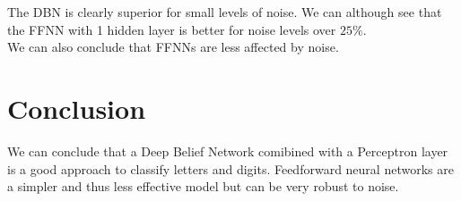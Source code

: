 \documentclass[a4paper, 11pt]{article}
\begin{document}
			The DBN is clearly superior for small levels of noise.
			We can although see that the FFNN with 1 hidden layer is better for noise levels over $ 25\% $.\\
			We can also conclude that FFNNs are less affected by noise.
		
	\section{Conclusion}
		We can conclude that a Deep Belief Network comibined with a Perceptron layer is a good approach to classify letters and digits.
		Feedforward neural networks are a simpler and thus less effective model but can be very robust to noise. 
			
	\printbibliography
				
\end{document}
